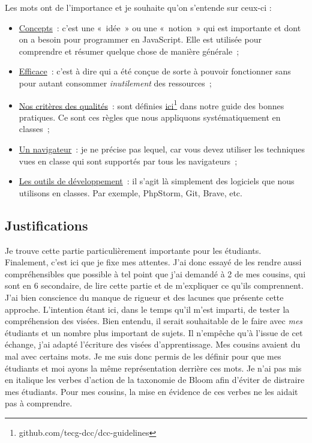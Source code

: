 Les mots ont de l'importance et je souhaite qu'on s'entende sur ceux-ci :

\begin{itemize}
    \item \underline{Concepts}~: c'est une «~idée~» ou une «~notion~» qui est importante et dont on a besoin pour programmer en JavaScript. Elle est utilisée pour comprendre et résumer quelque chose de manière générale~;
    \item \underline{Efficace}~: c'est à dire qui a été conçue de sorte à pouvoir fonctionner sans pour autant consommer \emph{inutilement} des ressources~;
    \item \underline{Nos critères des qualités}~: sont définies \href{https://github.com/tecg-dcc/dcc-guidelines}{ici}\footnote{github.com/tecg-dcc/dcc-guidelines} dans notre guide des bonnes pratiques. Ce sont ces règles que nous appliquons systématiquement en classes~;
    \item \underline{Un navigateur}~: je ne précise pas lequel, car vous devez utiliser les techniques vues en classe qui sont supportés par tous les navigateurs~;
    \item \underline{Les outils de développement}~: il s'agit là simplement des logiciels que nous utilisons en classes. Par exemple, PhpStorm, Git, Brave, etc.
\end{itemize}

\clearpage
\subsection{Justifications}

Je trouve cette partie particulièrement importante pour les étudiants. Finalement, c'est ici que je fixe mes attentes. J'ai donc essayé de les rendre aussi compréhensibles que possible à tel point que j'ai demandé à 2 de mes cousins, qui sont en 6 secondaire, de lire cette partie et de m’expliquer ce qu’ils comprennent. J'ai bien conscience du manque de rigueur et des lacunes que présente cette approche. L'intention étant ici, dans le temps qu'il m'est imparti, de tester la compréhension des visées. Bien entendu, il serait souhaitable de le faire avec \emph{mes} étudiants et un nombre plus important de sujets. Il n'empêche qu'à l’issue de cet échange, j'ai adapté l'écriture des visées d'apprentissage. Mes cousins avaient du mal avec certains mots. Je me suis donc permis de les définir pour que mes étudiants et moi ayons la même représentation derrière ces mots. Je n'ai pas mis en italique les verbes d'action de la taxonomie de Bloom afin d'éviter de distraire mes étudiants. Pour mes cousins, la mise en évidence de ces verbes ne les aidait pas à comprendre.\\

